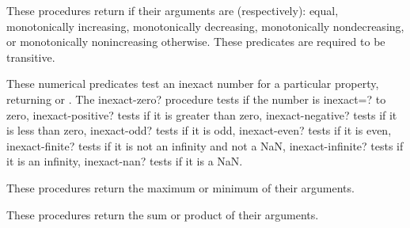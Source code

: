 \begin{entry}{%
}

These procedures return \schtrue{} if their arguments are
(respectively): equal, monotonically increasing, monotonically
decreasing, monotonically nondecreasing, or monotonically
nonincreasing \schfalse{} otherwise.  These predicates are required to
be transitive.
\end{entry}

\begin{entry}{%
}

These numerical predicates test an inexact number for a particular
property, returning \schtrue{} or \schfalse{}.  The {\cf
  inexact-zero?} procedure
tests if the number is {\cf inexact=?} to zero, {\cf
  inexact-positive?} tests if it is greater than zero, {\cf
  inexact-negative?} tests if it is less than zero, {\cf inexact-odd?}
tests if it is odd, {\cf inexact-even?} tests if it is even, {\cf
  inexact-finite?} tests if it is not an infinity and not a NaN, {\cf
  inexact-infinite?} tests if it is an infinity, {\cf inexact-nan?}
tests if it is a NaN.
\end{entry}

\begin{entry}{%
}

These procedures return the maximum or minimum of their arguments.
\end{entry}

\begin{entry}{%
}

These procedures return the sum or product of their arguments.
\end{entry}

